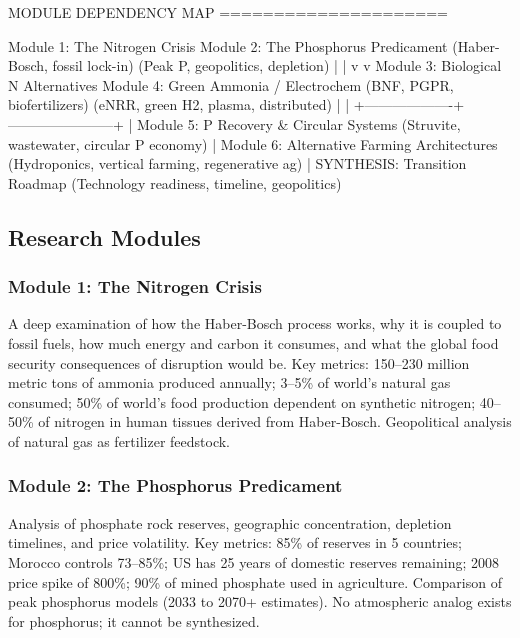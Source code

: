 \documentclass[11pt,letterpaper]{article}
\begin{document}
\begin{asciibox}
MODULE DEPENDENCY MAP
=====================

Module 1: The Nitrogen Crisis     Module 2: The Phosphorus Predicament
  (Haber-Bosch, fossil lock-in)      (Peak P, geopolitics, depletion)
         |                                         |
         v                                         v
Module 3: Biological N Alternatives    Module 4: Green Ammonia / Electrochem
  (BNF, PGPR, biofertilizers)           (eNRR, green H2, plasma, distributed)
         |                                         |
         +-------------------+-----------------------+
                             |
                    Module 5: P Recovery & Circular Systems
                      (Struvite, wastewater, circular P economy)
                             |
                    Module 6: Alternative Farming Architectures
                      (Hydroponics, vertical farming, regenerative ag)
                             |
                    SYNTHESIS: Transition Roadmap
                      (Technology readiness, timeline, geopolitics)
\end{asciibox}

\subsection{Research Modules}

\subsubsection{Module 1: The Nitrogen Crisis}

A deep examination of how the Haber-Bosch process works, why it is coupled to fossil fuels, how much energy and carbon it consumes, and what the global food security consequences of disruption would be. Key metrics: 150--230 million metric tons of ammonia produced annually; 3--5\% of world's natural gas consumed; 50\% of world's food production dependent on synthetic nitrogen; 40--50\% of nitrogen in human tissues derived from Haber-Bosch. Geopolitical analysis of natural gas as fertilizer feedstock.

\subsubsection{Module 2: The Phosphorus Predicament}

Analysis of phosphate rock reserves, geographic concentration, depletion timelines, and price volatility. Key metrics: 85\% of reserves in 5 countries; Morocco controls 73--85\%; US has 25 years of domestic reserves remaining; 2008 price spike of 800\%; 90\% of mined phosphate used in agriculture. Comparison of peak phosphorus models (2033 to 2070+ estimates). No atmospheric analog exists for phosphorus; it cannot be synthesized.
\end{document}
